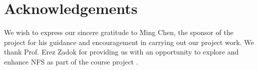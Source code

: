 \section{Acknowledgements}

We wish to express our sincere gratitude to Ming Chen, the sponsor of the project for his guidance and encouragement in carrying out our project work.
We thank Prof. Erez Zadok for providing us with an opportunity to explore and enhance NFS as part of the course project .